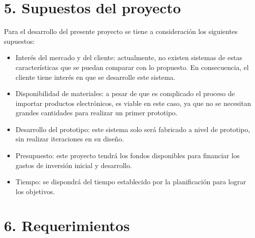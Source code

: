 \documentclass[
11pt, %
]{charter}
\begin{document}
\section{5. Supuestos del proyecto}
\label{sec:supuestos}

Para el desarrollo del presente proyecto se tiene a consideración los siguientes supuestos:

\begin{itemize}
	\item Interés del mercado y del cliente: actualmente, no existen sistemas de estas características que se puedan comparar con lo propuesto. En consecuencia, el cliente tiene interés en que se desarrolle este sistema.
	\item Disponibilidad de materiales: a pesar de que es complicado el proceso de importar productos electrónicos, es viable en este caso, ya que no se necesitan grandes cantidades para realizar un primer prototipo.
	\item Desarrollo del prototipo: este sistema solo será fabricado a nivel de prototipo, sin realizar iteraciones en su diseño.
	\item Presupuesto: este proyecto tendrá los fondos disponibles para financiar los gastos de inversión inicial y desarrollo.
	\item Tiempo: se dispondrá del tiempo establecido por la planificación para lograr los objetivos.
\end{itemize}


\section{6. Requerimientos}
\label{sec:requerimientos}
\end{document}
